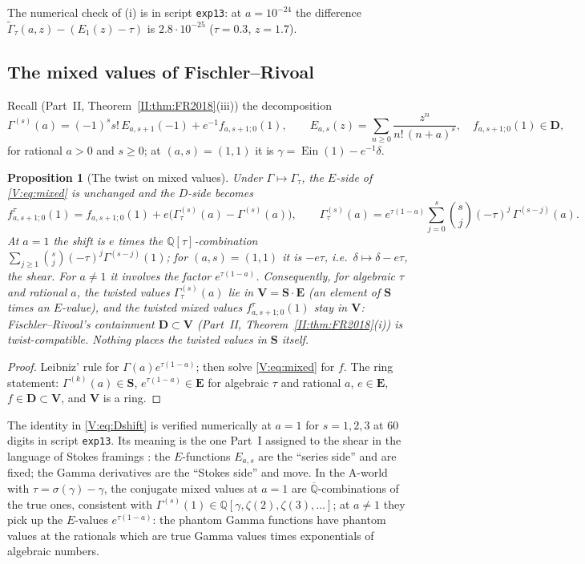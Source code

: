 \documentclass[11pt,a4paper]{article}
\newcommand{\Q}{\mathbb Q}
\newcommand{\Qbar}{\overline{\mathbb Q}}
\newcommand{\Ein}{\operatorname{Ein}}
\newcommand{\EE}{\mathbf E}
\newcommand{\DD}{\mathbf D}
\newcommand{\Sring}{\mathbf S}
\newcommand{\Vring}{\mathbf V}
\newtheorem{proposition}[theorem]{Proposition}
\theoremstyle{definition}
\theoremstyle{remark}
\numberwithin{equation}{section}
\begin{document}
The numerical check of (i) is in script \texttt{exp13}: at $a=10^{-24}$ the difference
$\widetilde\Gamma_\tau(a,z)-(E_1(z)-\tau)$ is $2.8\cdot10^{-25}$ ($\tau=0.3$, $z=1.7$).

\subsection{The mixed values of Fischler--Rivoal}

Recall (Part~II, Theorem~\ref{II:thm:FR2018}(iii)) the decomposition
\begin{equation}\label{V:eq:mixed}
 \Gamma^{(s)}(a)=(-1)^ss!\,E_{a,s+1}(-1)+e^{-1}f_{a,s+1;0}(1),\qquad
 E_{a,s}(z)=\sum_{n\ge0}\frac{z^n}{n!\,(n+a)^s},\quad f_{a,s+1;0}(1)\in\DD ,
\end{equation}
for rational $a>0$ and $s\ge0$; at $(a,s)=(1,1)$ it is $\gamma=\Ein(1)-e^{-1}\delta$.

\begin{proposition}[The twist on mixed values]\label{V:prop:mixed}
Under $\Gamma\mapsto\Gamma_\tau$, the $E$-side of \eqref{V:eq:mixed} is unchanged and the
$D$-side becomes
\begin{equation}\label{V:eq:Dshift}
 f^\tau_{a,s+1;0}(1)=f_{a,s+1;0}(1)+e\bigl(\Gamma_\tau^{(s)}(a)-\Gamma^{(s)}(a)\bigr),\qquad
 \Gamma_\tau^{(s)}(a)=e^{\tau(1-a)}\sum_{j=0}^s\binom sj(-\tau)^j\,\Gamma^{(s-j)}(a).
\end{equation}
At $a=1$ the shift is $e$ times the $\Q[\tau]$-combination $\sum_{j\ge1}\binom sj(-\tau)^j\Gamma^{(s-j)}(1)$;
for $(a,s)=(1,1)$ it is $-e\tau$, i.e.\ $\delta\mapsto\delta-e\tau$, the shear. For $a\ne1$
it involves the factor $e^{\tau(1-a)}$. Consequently, for algebraic $\tau$ and rational $a$,
the twisted values $\Gamma_\tau^{(s)}(a)$ lie in $\Vring=\Sring\cdot\EE$ (an element of
$\Sring$ times an $E$-value), and the twisted mixed values $f^\tau_{a,s+1;0}(1)$ stay in
$\Vring$: Fischler--Rivoal's containment $\DD\subset\Vring$ (Part~II, Theorem~\ref{II:thm:FR2018}(i)) is
twist-compatible. Nothing places the twisted values in $\Sring$ itself.
\end{proposition}
\begin{proof}
Leibniz' rule for $\Gamma(a)e^{\tau(1-a)}$; then solve \eqref{V:eq:mixed} for $f$. The ring
statement: $\Gamma^{(k)}(a)\in\Sring$, $e^{\tau(1-a)}\in\EE$ for algebraic $\tau$ and
rational $a$, $e\in\EE$, $f\in\DD\subset\Vring$, and $\Vring$ is a ring.
\end{proof}

The identity in \eqref{V:eq:Dshift} is verified numerically at $a=1$ for $s=1,2,3$ at $60$
digits in script \texttt{exp13}. Its meaning is the one Part~I assigned to the shear in the language
of Stokes framings \cite{K002}: the $E$-functions $E_{a,s}$ are the ``series side'' and are
fixed; the Gamma derivatives are the ``Stokes side'' and move. In the $\mathrm A$-world with
$\tau=\sigma(\gamma)-\gamma$, the conjugate mixed values at $a=1$ are $\Qbar$-combinations of
the true ones, consistent with $\Gamma^{(s)}(1)\in\Q[\gamma,\zeta(2),\zeta(3),\dots]$; at
$a\ne1$ they pick up the $E$-values $e^{\tau(1-a)}$: the phantom Gamma functions have
phantom values at the rationals which are true Gamma values times exponentials of algebraic
numbers.
\end{document}
